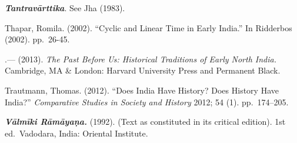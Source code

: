 \begin{thebibliography}{99}
  \textbf{\textit{Tantravārttika}}. See Jha (1983).

  Thapar, Romila. (2002). “Cyclic and Linear Time in Early India.” In Ridderbos (2002). pp.~26-45.

 .— (2013). \textit{The Past Before Us: Historical Traditions of Early North India.} Cambridge, MA \& London: Harvard University Press and Permanent Black.

  Trautmann, Thomas. (2012). “Does India Have History? Does History Have India?” \textit{Comparative Studies in Society and History} 2012; 54 (1). pp.~174--205.

  \textbf{\textit{Vālmīki Rāmāyaṇa.}} (1992). (Text as constituted in its critical edition). 1st ed.\ Vadodara, India: Oriental Institute.

 \end{thebibliography}

\theendnotes

